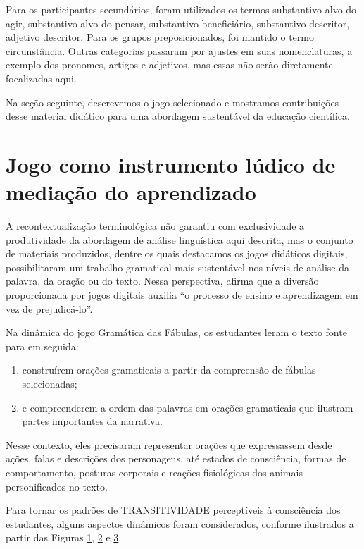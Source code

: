 Para os participantes secundários, foram utilizados os termos
substantivo alvo do agir, substantivo alvo do pensar, substantivo
beneficiário, substantivo descritor, adjetivo descritor. Para os grupos
preposicionados, foi mantido o termo circunstância. Outras categorias
passaram por ajustes em suas nomenclaturas, a exemplo dos pronomes,
artigos e adjetivos, mas essas não serão diretamente focalizadas aqui.

Na seção seguinte, descrevemos o jogo selecionado e mostramos
contribuições desse material didático para uma abordagem sustentável da
educação científica.

\section{Jogo como instrumento lúdico de mediação do aprendizado}\label{sec-jogocomoinstrumentolúdicodemediaçãodoaprendizado}

A recontextualização terminológica não garantiu com exclusividade a
produtividade da abordagem de análise linguística aqui descrita, mas o
conjunto de materiais produzidos, dentre os quais destacamos os jogos
didáticos digitais, possibilitaram um trabalho gramatical mais
sustentável nos níveis de análise da palavra, da oração ou do texto.
Nessa perspectiva, \textcite[p .498]{prensky_aprendizagem_2012} afirma que a diversão
proporcionada por jogos digitais auxilia ``o processo de ensino e
aprendizagem em vez de prejudicá-lo''.

\label{anchor-5}{}Na dinâmica do jogo Gramática das
Fábulas, os estudantes leram o texto fonte para em seguida: 
\begin{enumerate}
\item construírem orações gramaticais a partir da compreensão de fábulas
selecionadas; 
\item e compreenderem a ordem das palavras em orações
gramaticais que ilustram partes importantes da narrativa. 
\end{enumerate}

Nesse contexto, eles precisaram representar orações que expressassem desde
ações, falas e descrições dos personagens, até estados de consciência,
formas de comportamento, posturas corporais e reações fisiológicas dos
animais personificados no texto.

Para tornar os padrões de TRANSITIVIDADE perceptíveis à consciência dos
estudantes, alguns aspectos dinâmicos foram considerados, conforme
ilustrados a partir das Figuras \hyperref[fig:fig01]{1}, \hyperref[fig:fig02]{2} e \hyperref[fig:fig03]{3}.

